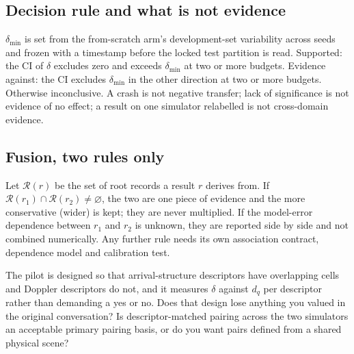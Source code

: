 \subsection[Decision rule and what is not evidence]{Decision rule and what is not evidence\hfill{\normalfont\small \tagG{}}}

$\delta_{\min}$ is set from the from-scratch arm's development-set variability across seeds and frozen with a timestamp before the locked test partition is read. Supported: the CI of $\delta$ excludes zero and exceeds $\delta_{\min}$ at two or more budgets. Evidence against: the CI excludes $\delta_{\min}$ in the other direction at two or more budgets. Otherwise inconclusive. A crash is not negative transfer; lack of significance is not evidence of no effect; a result on one simulator relabelled is not cross-domain evidence.

\subsection[Fusion, two rules only]{Fusion, two rules only\hfill{\normalfont\small \tagG{}}}

Let $\mathcal R(r)$ be the set of root records a result $r$ derives from. If $\mathcal R(r_1)\cap\mathcal R(r_2)\neq\varnothing$, the two are one piece of evidence and the more conservative (wider) is kept; they are never multiplied. If the model-error dependence between $r_1$ and $r_2$ is unknown, they are reported side by side and not combined numerically. Any further rule needs its own association contract, dependence model and calibration test.

\begin{question}
The pilot is designed so that arrival-structure descriptors have overlapping cells and Doppler descriptors do not, and it measures $\delta$ against $d_q$ per descriptor rather than demanding a yes or no. Does that design lose anything you valued in the original conversation? Is descriptor-matched pairing across the two simulators an acceptable primary pairing basis, or do you want pairs defined from a shared physical scene?
\end{question}
